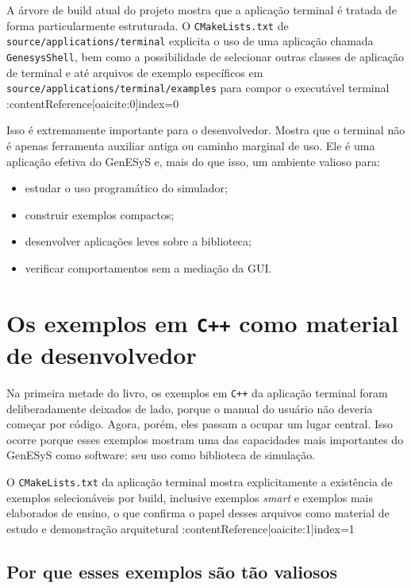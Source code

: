 A árvore de build atual do projeto mostra que a aplicação terminal é tratada de forma particularmente estruturada. O \texttt{CMakeLists.txt} de \texttt{source/applications/terminal} explicita o uso de uma aplicação chamada \texttt{GenesysShell}, bem como a possibilidade de selecionar outras classes de aplicação de terminal e até arquivos de exemplo específicos em \texttt{source/applications/terminal/examples} para compor o executável terminal :contentReference[oaicite:0]{index=0}

Isso é extremamente importante para o desenvolvedor. Mostra que o terminal não é apenas ferramenta auxiliar antiga ou caminho marginal de uso. Ele é uma aplicação efetiva do GenESyS e, mais do que isso, um ambiente valioso para:
\begin{itemize}
    \item estudar o uso programático do simulador;
    \item construir exemplos compactos;
    \item desenvolver aplicações leves sobre a biblioteca;
    \item verificar comportamentos sem a mediação da GUI.
\end{itemize}

\section{Os exemplos em \texttt{C++} como material de desenvolvedor}
\label{sec:cap10_exemplos_cpp_material_desenvolvedor}

Na primeira metade do livro, os exemplos em \texttt{C++} da aplicação terminal foram deliberadamente deixados de lado, porque o manual do usuário não deveria começar por código. Agora, porém, eles passam a ocupar um lugar central. Isso ocorre porque esses exemplos mostram uma das capacidades mais importantes do GenESyS como software: seu uso como biblioteca de simulação.

O \texttt{CMakeLists.txt} da aplicação terminal mostra explicitamente a existência de exemplos selecionáveis por build, inclusive exemplos \textit{smart} e exemplos mais elaborados de ensino, o que confirma o papel desses arquivos como material de estudo e demonstração arquitetural :contentReference[oaicite:1]{index=1}

\subsection{Por que esses exemplos são tão valiosos}
\label{subsec:cap10_por_que_exemplos_tao_valiosos}

